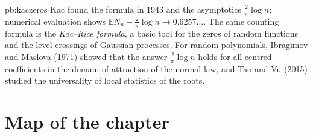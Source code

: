 \begin{solution}{pb:kaczeros}
\leads Kac found the formula in 1943 and the asymptotics $\frac2\pi\log n$; numerical evaluation shows $\mathbb EN_n-\frac2\pi\log n\to0.6257\ldots$. The same counting formula is the
\emph{Kac--Rice formula}, a basic tool for the zeros of random functions and the level crossings of Gaussian processes. For random polynomials, Ibragimov and Maslova (1971)
showed that the answer $\frac2\pi\log n$ holds for all centred coefficients in the domain of attraction of the normal law, and Tao and Vu (2015) studied the universality of
local statistics of the roots.
\end{solution}

\section*{Map of the chapter}

